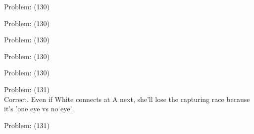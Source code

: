 \documentclass[11pt]{article}
\begin{document}
\begin{minipage}[t]{0.5\textwidth}
  {\centering
  
  Problem: (130)\\
  
  }
\end{minipage}
\begin{minipage}[t]{0.5\textwidth}
  {\centering
  
  Problem: (130)\\
  
  }
\end{minipage}
\begin{minipage}[t]{0.5\textwidth}
  {\centering
  
  Problem: (130)\\
  
  }
\end{minipage}
\begin{minipage}[t]{0.5\textwidth}
  {\centering
  
  Problem: (130)\\
  
  }
\end{minipage}
\begin{minipage}[t]{0.5\textwidth}
  {\centering
  
  Problem: (130)\\
  
  }
\end{minipage}
\begin{minipage}[t]{0.5\textwidth}
  {\centering
  
  Problem: (131)\\
  Correct. Even if White connects at A next, she'll lose the capturing race because it's 'one eye vs no eye'.\\
  }
\end{minipage}
\begin{minipage}[t]{0.5\textwidth}
  {\centering
  
  Problem: (131)\\
  
  }
\end{minipage}
\end{document}
